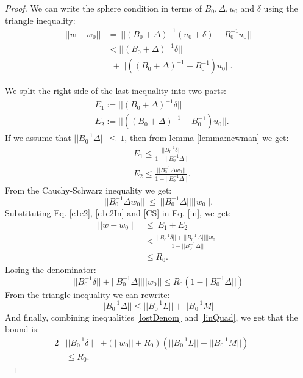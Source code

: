 \documentclass[11pt,twocolumn,varwidth=true,a4paper,fleqn]{article}
\begin{document}
\begin{proof}
We can write the sphere condition in terms of $B_0, \Delta, u_0$ and $\delta$ using the triangle
inequality:
\begin{equation} \label{in}
\begin{split}
||w-w_0|| & = \ ||(B_0+\Delta)^{-1}(u_0+\delta) - B_0^{-1}u_0|| \\
& < ||(B_0+\Delta)^{-1}\delta|| \\
& \ \ + ||((B_0+\Delta)^{-1} - B_0^{-1})u_0||.
\end{split}
\end{equation}

We split the right side of the last inequality into two parts:
\begin{equation}  \label{e1e2}
\begin{split}
& E_1:= ||(B_0+\Delta)^{-1}\delta|| \\
& E_2:= ||((B_0+\Delta)^{-1} - B_0^{-1})u_0||.
\end{split}
\end{equation}
If we assume that $||B_0^{-1}\Delta||\ \leq \ 1$, 
then from lemma \ref{lemma:newman} we get:
\begin{equation} \label{e1e2In}
\begin{split}
& E_1 \leq \frac{||B_0^{-1}\delta||}{1-||B_0^{-1}\Delta||} \\
& E_2 \leq  \frac{|| B_0^{-1}\Delta w_0||}{1-||B_0^{-1}\Delta||}.
\end{split}
\end{equation}
From the Cauchy-Schwarz inequality we get:
\begin{equation} \label{CS}
||B_0^{-1}\Delta w_0|| \ \leq \ ||B_0^{-1}\Delta||||w_0||.
\end{equation}
Substituting Eq. \ref{e1e2}, \ref{e1e2In} and \ref{CS} in Eq. \ref{in}, we
get:
\begin{equation}
\begin{split}
|| w-w_0 \parallel & \leq \ E_1+E_2 \\
& \leq \frac{||B_0^{-1}\delta|| + ||B_0^{-1}\Delta||||w_0||}{1 -||B_0^{-1}\Delta||} \\
& \leq R_0.
\end{split}
\end{equation}
Losing the denominator:
\begin{equation} \label{lostDenom}
||B_0^{-1}\delta|| + ||B_0^{-1}\Delta||||w_0||
\leq R_0(1 -||B_0^{-1}\Delta||)
\end{equation}
From the triangle inequality we can rewrite:
\begin{equation} \label{linQuad}
||B_0^{-1}\Delta|| \leq ||B_0^{-1}L||+||B_0^{-1}M||
\end{equation}
And finally, combining inequalities \ref{lostDenom} and \ref{linQuad},
we get that the bound is:
\begin{alignat*}{2} \label{convexBound}
&||B_0^{-1}\delta|| &+ (||w_0||+R_0)(||B_0^{-1}L||+||B_0^{-1}M||) && \\ 
& \leq R_0. &&
\end{alignat*}
\end{proof}
\end{document}
